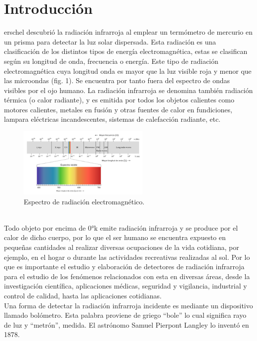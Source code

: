 \documentclass[a4paper,journal]{IEEEtran}
\begin{document}
\section{Introducción}
erschel descubrió la radiación infrarroja al emplear un termómetro de mercurio en un prisma para detectar la luz solar dispersada. Esta radiación es una clasificación de los distintos tipos de energía electromagnética, estas se clasifican según su longitud de onda, frecuencia o energía. Este tipo de radiación electromagnética cuya longitud onda es mayor que la luz visible roja y menor que las microondas (fig. 1). Se encuentra por tanto fuera del espectro de ondas visibles por el ojo humano. La radiación infrarroja se denomina también radiación térmica (o calor radiante), y es emitida por todos los objetos calientes como motores calientes, metales en fusión y otras fuentes de calor en fundiciones, lampara eléctricas incandescentes, sistemas de calefacción radiante, etc.
\begin{figure}[h]
\centering
\includegraphics[width=2.5in]{spectre}
\caption{Espectro de radiación electromagnético.}
\label{spectre}
\end{figure}
\\ 
Todo objeto por encima de 0°k emite radiación infrarroja y se produce por el calor de dicho cuerpo, por lo que el ser humano se encuentra expuesto en pequeñas cantidades al realizar diversas ocupaciones de la vida cotidiana, por ejemplo, en el hogar o durante las actividades recreativas realizadas al sol. Por lo que es importante el estudio y elaboración de detectores de radiación infrarroja para el estudio de los fenómenos relacionados con esta en diversas áreas, desde la investigación científica, aplicaciones médicas, seguridad y vigilancia, industrial y control de calidad, hasta las aplicaciones cotidianas.
\\
Una forma de detectar la radiación infrarroja incidente es mediante un dispositivo llamado bolómetro. Esta palabra proviene de griego “bole” lo cual significa rayo de luz y “metrón”, medida. El astrónomo Samuel Pierpont Langley lo inventó en 1878.
\\
\end{document}
